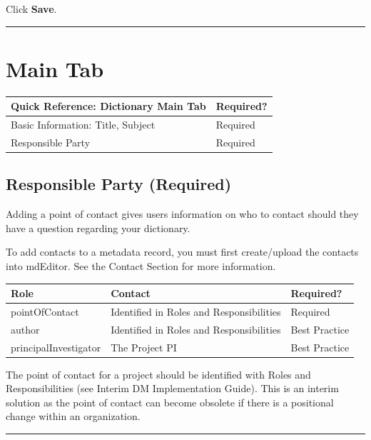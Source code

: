 \documentclass[
]{book}
\makeatletter
\newenvironment{kframe}{%
\medskip{}
\setlength{\fboxsep}{.8em}
 \def\at@end@of@kframe{}%
 \ifinner\ifhmode%
  \def\at@end@of@kframe{\end{minipage}}%
  \begin{minipage}{\columnwidth}%
 \fi\fi%
 \def\FrameCommand##1{\hskip\@totalleftmargin \hskip-\fboxsep
 \colorbox{shadecolor}{##1}\hskip-\fboxsep
     \hskip-\linewidth \hskip-\@totalleftmargin \hskip\columnwidth}%
 \MakeFramed {\advance\hsize-\width
   \@totalleftmargin\z@ \linewidth\hsize
   \@setminipage}}%
 {\par\unskip\endMakeFramed%
 \at@end@of@kframe}
\newenvironment{rmdblock}[1]
  {
  \begin{itemize}
  \renewcommand{\labelitemi}{
    \raisebox{-.7\height}[0pt][0pt]{
      {\setkeys{Gin}{width=3em,keepaspectratio}\texttt{[image: images/\#1]}}
    }
  }
  \setlength{\fboxsep}{1em}
  \begin{kframe}
  \item
  }
  {
  \end{kframe}
  \end{itemize}
  }
\newenvironment{rmdtip}
  {\begin{rmdblock}{tip}}
  {\end{rmdblock}}
\makeatother
\begin{document}
Click \textbf{Save}.

\begin{center}\rule{0.5\linewidth}{\linethickness}\end{center}

\hypertarget{main-tab}{%
\section{Main Tab}\label{main-tab}}

\begin{longtable}[]{@{}ll@{}}
\toprule
Quick Reference: Dictionary Main Tab & Required?\tabularnewline
\midrule
\endhead
Basic Information: Title, Subject & Required\tabularnewline
Responsible Party & Required\tabularnewline
\bottomrule
\end{longtable}

\hypertarget{responsible-party-required}{%
\subsection{Responsible Party (Required)}\label{responsible-party-required}}

Adding a point of contact gives users information on who to contact should they have a question regarding your dictionary.

\begin{rmdtip}
To add contacts to a metadata record, you must first create/upload the
contacts into mdEditor. See the Contact Section for more information.
\end{rmdtip}

\begin{longtable}[]{@{}lll@{}}
\toprule
Role & Contact & Required?\tabularnewline
\midrule
\endhead
pointOfContact & Identified in Roles and Responsibilities & Required\tabularnewline
author & Identified in Roles and Responsibilities & Best Practice\tabularnewline
principalInvestigator & The Project PI & Best Practice\tabularnewline
\bottomrule
\end{longtable}

The point of contact for a project should be identified with Roles and Responsibilities (see Interim DM Implementation Guide). This is an interim solution as the point of contact can become obsolete if there is a positional change within an organization.

\begin{center}\rule{0.5\linewidth}{\linethickness}\end{center}
\end{document}
